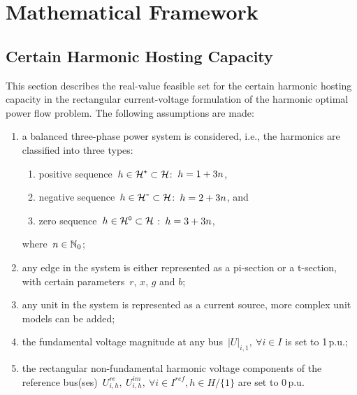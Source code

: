 \documentclass[journal]{IEEEtran}
\begin{document}
\section{Mathematical Framework}
\label{sec:mathematical_framework}

\subsection{Certain Harmonic Hosting Capacity}
\label{sec:certain_harmonic_hosting_capacity}

This section describes the real-value feasible set for the certain harmonic hosting capacity in the rectangular current-voltage formulation of the harmonic optimal power flow problem. The following assumptions are made:
\begin{enumerate}
    \item a balanced three-phase power system is considered, i.e., the harmonics are classified into three types:
    \begin{enumerate}
        \item positive sequence~$h \in \mathcal{H}^{\texttt{+}} \subset \mathcal{H}$:~$h=1+3n$,
        \item negative sequence~$h \in \mathcal{H}^{\texttt{-}} \subset \mathcal{H}$:~$h=2+3n$, and
        \item zero sequence~$h \in \mathcal{H}^{\texttt{0}} \subset \mathcal{H}$ :~$h=3+3n$,
    \end{enumerate}
    where~$n \in \mathbb{N}_{0}$;
    \item any edge in the system is either represented as a pi-section or a t-section, with certain parameters~$r$, $x$, $g$ and $b$;
    \item any unit in the system is represented as a current source, more complex unit models can be added;
    \item the fundamental voltage magnitude at any bus~$|U|_{i,1},~\forall i \in I$ is set to 1\,p.u.;
    \item the rectangular non-fundamental harmonic voltage components of the reference bus(ses)~$U^{re}_{i,h},~U^{im}_{i,h},~\forall i \in I^{ref}, h \in H/\{1\}$ are set to 0\,p.u.
\end{enumerate}
\end{document}
